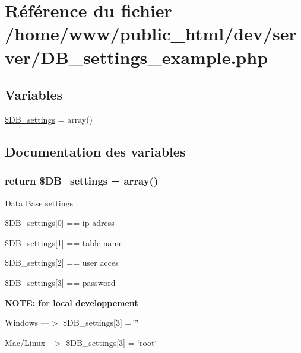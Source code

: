 \hypertarget{_d_b__settings__example_8php}{\section{Référence du fichier /home/www/public\-\_\-html/dev/server/\-D\-B\-\_\-settings\-\_\-example.php}
\label{_d_b__settings__example_8php}
}
\subsection*{Variables}
\begin{DoxyCompactItemize}
\item 
\hyperlink{_d_b__settings__example_8php_a6ab31640096bdadca5e526746d474aed}{\$\-D\-B\-\_\-settings} = array()
\end{DoxyCompactItemize}


\subsection{Documentation des variables}
\hypertarget{_d_b__settings__example_8php_a6ab31640096bdadca5e526746d474aed}{
\subsubsection[{\$\-D\-B\-\_\-settings}]{\setlength{\rightskip}{0pt plus 5cm}return \$D\-B\-\_\-settings = array()}}\label{_d_b__settings__example_8php_a6ab31640096bdadca5e526746d474aed}
Data Base settings \-: 

\$\-D\-B\-\_\-settings\mbox{[}0\mbox{]} == ip adress \par
 \$\-D\-B\-\_\-settings\mbox{[}1\mbox{]} == table name \par
 \$\-D\-B\-\_\-settings\mbox{[}2\mbox{]} == user acces \par
 \$\-D\-B\-\_\-settings\mbox{[}3\mbox{]} == password \par


{\bfseries  N\-O\-T\-E\-: for local developpement } \par
 Windows ---$>$ \$\-D\-B\-\_\-settings\mbox{[}3\mbox{]} = \char`\"{}\char`\"{} \par
 Mac/\-Linux --$>$ \$\-D\-B\-\_\-settings\mbox{[}3\mbox{]} = \char`\"{}root\char`\"{} \par
 